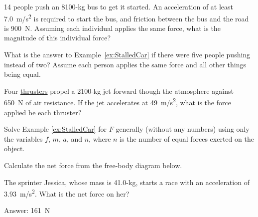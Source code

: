 \documentclass[main.tex]{subfiles}
\begin{document}
\begin{exercise} \label{w6N0j0}
14 people push an 8100-kg bus to get it started. An acceleration of at least \SI{7.0}{m/s^2} is required to start the bus, and friction between the bus and the road is \SI{900}{N}. Assuming each individual applies the same force, what is the magnitude of this individual force?
\end{exercise}

\begin{exercise} \label{WHMhQG}
    What is the answer to Example~\ref{ex:StalledCar} if there were five people pushing instead of two? Assume each person applies the same force and all other things being equal.
\end{exercise}

\begin{exercise} \label{DV094w}
Four \href{https://en.wikipedia.org/wiki/Spacecraft_propulsion#/media/File:Shuttle_Main_Engine_Test_Firing.jpg}{thrusters} propel a 2100-kg jet forward though the atmosphere against \SI{650}{N} of air resistance. If the jet accelerates at \SI{49}{m/s^2}, what is the force applied be each thruster? 
\end{exercise}

\begin{exercise} \label{e1ANRE}
Solve Example \ref{ex:StalledCar} for $F$ generally (without any numbers) using only the variables $f$, $m$, $a$, and $n$, where $n$ is the number of equal forces exerted on the object.
\end{exercise}




\begin{exercise}
Calculate the net force from the free-body diagram below.


\begin{center}
\end{center}
\end{exercise}

\begin{exercise}
The sprinter Jessica, whose mass is 41.0-kg, starts a race with an acceleration of \SI{3.93}{m/s^2}. What is the net force on her?


{\color{red} Answer: \SI{161}{N}}

\end{exercise}
\end{document}
